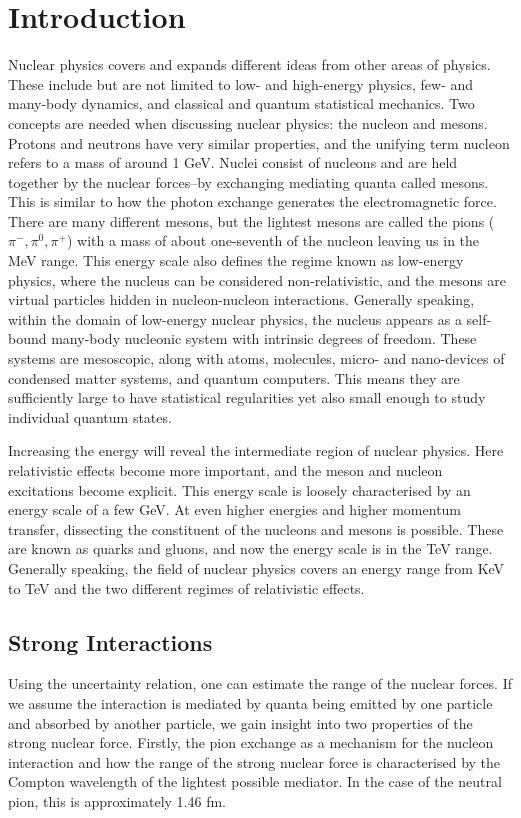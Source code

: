 \chapter{Introduction}
Nuclear physics covers and expands different ideas from other areas of physics. These include but are not limited to low- and high-energy physics, few- and many-body dynamics, and classical and quantum statistical mechanics. Two concepts are needed when discussing nuclear physics: the nucleon and mesons. Protons and neutrons have very similar properties, and the unifying term nucleon refers to a mass of around 1 GeV. Nuclei consist of nucleons and are held together by the nuclear forces--by exchanging mediating quanta called mesons. This is similar to how the photon exchange generates the electromagnetic force. There are many different mesons, but the lightest mesons are called the pions ($\pi^-,\pi^0,\pi^+$) with a mass of about one-seventh of the nucleon leaving us in the MeV range. This energy scale also defines the regime known as low-energy physics, where the nucleus can be considered non-relativistic, and the mesons are virtual particles hidden in nucleon-nucleon interactions.
Generally speaking, within the domain of low-energy nuclear physics, the nucleus appears as a self-bound many-body nucleonic system with intrinsic degrees of freedom. These systems are mesoscopic, along with atoms, molecules, micro- and nano-devices of condensed matter systems, and quantum computers. This means they are sufficiently large to have statistical regularities yet also small enough to study individual quantum states.

Increasing the energy will reveal the intermediate region of nuclear physics. Here relativistic effects become more important, and the meson and nucleon excitations become explicit. This energy scale is loosely characterised by an energy scale of a few GeV. At even higher energies and higher momentum transfer, dissecting the constituent of the nucleons and mesons is possible. These are known as quarks and gluons, and now the energy scale is in the TeV range. Generally speaking, the field of nuclear physics covers an energy range from KeV to TeV and the two different regimes of relativistic effects. 
\section{Strong Interactions}
Using the uncertainty relation, one can estimate the range of the nuclear forces. If we assume the interaction is mediated by quanta being emitted by one particle and absorbed by another particle, we gain insight into two properties of the strong nuclear force. Firstly, the pion exchange as a mechanism for the nucleon interaction and how the range of the strong nuclear force is characterised by the Compton wavelength of the lightest possible mediator. In the case of the neutral pion, this is approximately 1.46 fm. 
